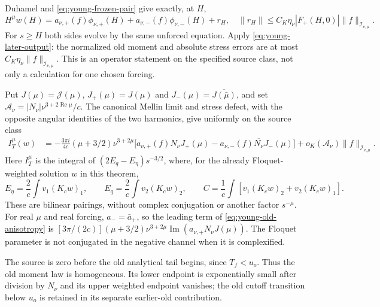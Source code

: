 Duhamel and \eqref{eq:young-frozen-pair} give exactly, at $H$,
\[
 H^\mu w(H)=
 a_{\nu,+}(f)\phi_{\nu,+}(H)
 +a_{\nu,-}(f)\phi_{\nu,-}(H)+r_H,
 \quad
 \|r_H\|\le C_K\eta_\nu|F_+(H,0)|
                                  \|f\|_{\mathcal I_{\nu,\mu}}.
\]
For $s\ge H$ both sides evolve by the same unforced equation.
Apply \eqref{eq:young-later-output}: the normalized old moment and
absolute stress errors are at most
$C_K\eta_\nu\|f\|_{\mathcal I_{\nu,\mu}}$.
This is an operator statement on the specified source class, not
only a calculation for one chosen forcing.

Put $J(\mu)=\mathcal J(\mu)$, $J_+(\mu)=J(\mu)$ and
$J_-(\mu)=\overline{J(\bar\mu)}$, and set
$\mathcal A_\nu=|N_\nu|\nu^{3+2\operatorname{Re}\mu}/c$.
The canonical Mellin limit and stress defect, with the opposite
angular identities of the two harmonics, give uniformly on the source class
\begin{align}
 I_T^\mu(w)
  &=-\frac{3\pi i}{4c}(\mu+3/2)\nu^{3+2\mu}
      \bigl[a_{\nu,+}(f)N_\nu J_+(\mu)
          -a_{\nu,-}(f)\overline{N_\nu}J_-(\mu)\bigr]
       +o_K(\mathcal A_\nu)\|f\|_{\mathcal I_{\nu,\mu}}.
       \label{eq:young-old-anisotropy}
\end{align}
Here $I_T^\mu$ is the integral of
$(2E_q-E_\eta)s^{-3/2}$, where, for the already Floquet-weighted
solution $w$ in this theorem,
\[
 E_\eta=\frac2c\int v_1(K_cw)_1,\qquad
 E_q=\frac2c\int v_2(K_cw)_2,\qquad
 C=\frac1c\int[v_1(K_cw)_2+v_2(K_cw)_1].
\]
These are bilinear pairings, without complex conjugation or another
factor $s^{-\mu}$.
For real $\mu$ and real forcing, $a_-=\bar a_+$, so the leading
term of \eqref{eq:young-old-anisotropy} is
$[3\pi/(2c)](\mu+3/2)\nu^{3+2\mu}
\operatorname{Im}(a_{\nu,+}N_\nu J(\mu))$.
The Floquet parameter is not conjugated in the negative channel
when it is complexified.

The source is zero before the old analytical tail begins, since
$T_f<u_o$. Thus the old moment law is homogeneous. Its lower endpoint
is exponentially small after division by $N_\nu$ and its upper
weighted endpoint vanishes; the old cutoff transition below $u_o$
is retained in its separate earlier-old contribution.

